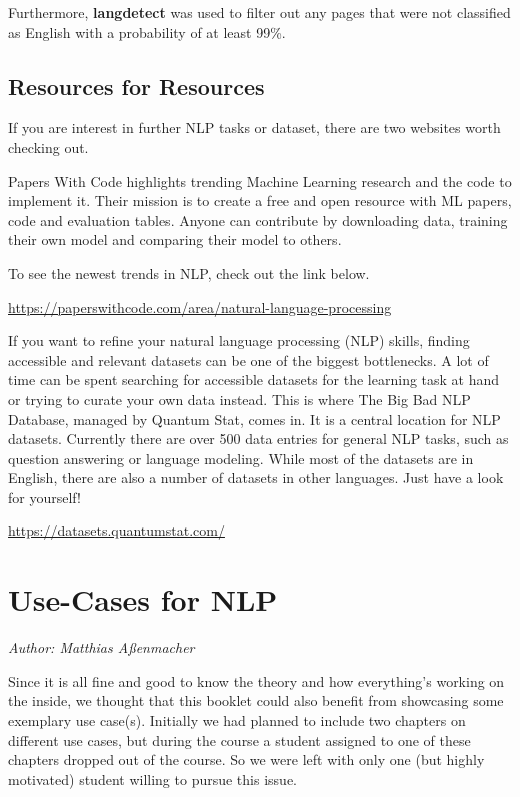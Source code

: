 \documentclass[]{krantz}
\begin{document}
Furthermore, \textbf{langdetect} was used to filter out any pages that were not classified as English with a probability of at least 99\%.

\citep{raffel2019exploring}

\hypertarget{resources-for-resources}{%
\section{Resources for Resources}\label{resources-for-resources}}

If you are interest in further NLP tasks or dataset, there are two websites worth checking out.

Papers With Code highlights trending Machine Learning research and the code to implement it. Their mission is to create a free and open resource with ML papers, code and evaluation tables. Anyone can contribute by downloading data, training their own model and comparing their model to others.

To see the newest trends in NLP, check out the link below.

\center \url{https://paperswithcode.com/area/natural-language-processing}

\flushleft

If you want to refine your natural language processing (NLP) skills, finding accessible and relevant datasets can be one of the biggest bottlenecks. A lot of time can be spent searching for accessible datasets for the learning task at hand or trying to curate your own data instead. This is where The Big Bad NLP Database, managed by Quantum Stat, comes in. It is a central location for NLP datasets. Currently there are over 500 data entries for general NLP tasks, such as question answering or language modeling. While most of the datasets are in English, there are also a number of datasets in other languages.
Just have a look for yourself!

\center \url{https://datasets.quantumstat.com/}

\flushleft

\hypertarget{use-cases-for-nlp}{%
\chapter{Use-Cases for NLP}\label{use-cases-for-nlp}}

\emph{Author: Matthias Aßenmacher}

Since it is all fine and good to know the theory and how everything's working on the inside,
we thought that this booklet could also benefit from showcasing some exemplary use case(s).
Initially we had planned to include two chapters on different use cases, but during the course
a student assigned to one of these chapters dropped out of the course. So we were left with only
one (but highly motivated) student willing to pursue this issue.
\end{document}
